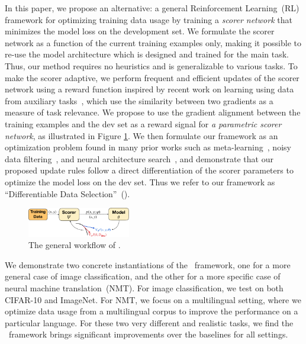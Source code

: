 In this paper, we propose an alternative: a general Reinforcement Learning~(RL) framework for optimizing training data usage by training a \emph{scorer network} that minimizes the model loss on the development set.
We formulate the scorer network as a function of the current training examples only,
making it possible to re-use the model architecture which is designed and trained for the main task. Thus, our method requires no heuristics and is generalizable to various tasks. To make the scorer adaptive, we perform frequent and efficient updates of the scorer network using a reward function inspired by recent work on learning using data from auxiliary tasks~\citep{cos_sim,meta_aux_learn}, which use the similarity between two gradients as a measure of task relevance.
We propose to use the gradient alignment between the training examples and the dev set as a reward signal for \emph{a parametric scorer network}, as illustrated in Figure \ref{fig:method}. We then formulate our framework as an optimization problem found in many prior works such as meta-learning~\citep{finn2017model}, noisy data filtering~\citep{learn_reweight}, and neural architecture search~\citep{darts}, and demonstrate that our proposed update rules follow a direct differentiation of the scorer parameters to optimize the model loss on the dev set.
Thus we refer to our framework as ``Differentiable Data Selection''~(\dds).

\begin{figure}
    \centering
    \includegraphics[width=0.4\textwidth]{figs/method_plot_crop.pdf}
    \caption{The general workflow of \dds.}
    \label{fig:method}
\end{figure}

We demonstrate two concrete instantiations of the \dds~framework, one for a more general case of image classification, and the other for a more specific case of neural machine translation~(NMT). For image classification, we test on both CIFAR-10 and ImageNet. For NMT, we focus on a multilingual setting, where we optimize data usage from a multilingual corpus to improve the performance on a particular language. %
For these two very different and realistic tasks, we find the \dds~framework brings significant improvements over the baselines for all settings.